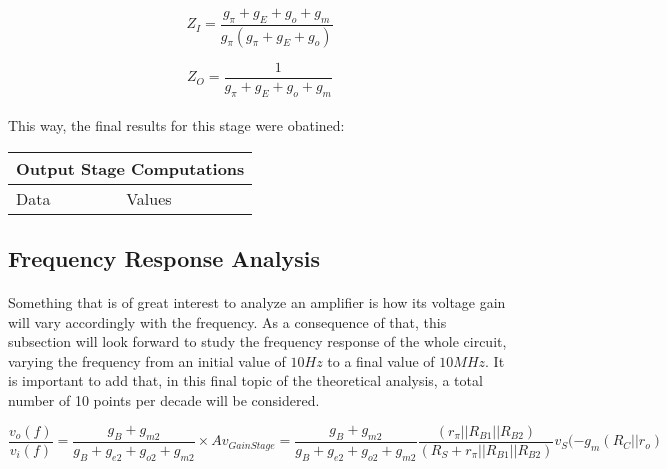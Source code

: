 \begin{equation}
    Z_I=\frac{g_\pi+g_E+g_o+g_m}{g_\pi(g_\pi+g_E+g_o)}
\end{equation}

\begin{equation}
    Z_O=\frac{1}{g_\pi+g_E+g_o+g_m}
\end{equation}


\paragraph{}This way, the final results for this stage were obatined:

\begin{table}[H]
\centering
\begin{tabular}{|l|l|} 
\hline
\multicolumn{2}{|l|}{\textbf{Output Stage Computations}}  \\ 
\hline
Data             & Values                               \\ 
\hline
%        
\end{tabular}
\end{table}




\subsection{Frequency Response Analysis}

\paragraph{}Something that is of great interest to analyze an amplifier is how its voltage gain will vary accordingly with the frequency. As a consequence of that, this subsection will look forward to study the frequency response of the whole circuit, varying the frequency from an initial value of $10 Hz$ to a final value of $10 MHz$. It is important to add that, in this final topic of the theoretical analysis, a total number of 10 points per decade will be considered.


\begin{equation}
    \frac{v_o(f)}{v_i(f)}=\frac{g_B+g_{m2}}{g_B+g_{e2}+g_{o2}+g_{m2}}\times Av_{Gain Stage}=\frac{g_B+g_{m2}}{g_B+g_{e2}+g_{o2}+g_{m2}}\frac{(r_\pi||R_{B1}||R_{B2})}{(R_S+r_\pi||R_{B1}||R_{B2})}
    v_S(-g_m(R_C||r_o)
\end{equation}








